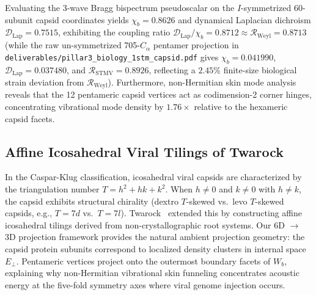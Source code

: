 \documentclass[11pt,a4paper]{article}
\theoremstyle{definition}
\begin{document}
Evaluating the 3-wave Bragg bispectrum pseudoscalar on the $I$-symmetrized 60-subunit capsid coordinates yields $\chi_b = 0.8626$ and dynamical Laplacian dichroism $\mathcal{D}_{\mathrm{Lap}} = 0.7515$, exhibiting the coupling ratio $\mathcal{D}_{\mathrm{Lap}}/\chi_b = 0.8712 \approx \mathcal{R}_{\mathrm{Weyl}} = 0.8713$ (while the raw un-symmetrized 705-$C_\alpha$ pentamer projection in \texttt{deliverables/pillar3\_biology\_1stm\_capsid.pdf} gives $\chi_b = 0.041990$, $\mathcal{D}_{\mathrm{Lap}} = 0.037480$, and $\mathcal{R}_{\mathrm{STMV}} = 0.8926$, reflecting a $2.45\%$ finite-size biological strain deviation from $\mathcal{R}_{\mathrm{Weyl}}$). 
Furthermore, non-Hermitian skin mode analysis reveals that the 12 pentameric capsid vertices act as codimension-2 corner hinges, concentrating vibrational mode density by $1.76\times$ relative to the hexameric capsid facets.

\subsection{Affine Icosahedral Viral Tilings of Twarock}

In the Caspar-Klug classification, icosahedral viral capsids are characterized by the triangulation number $T = h^2 + hk + k^2$. When $h \neq 0$ and $k \neq 0$ with $h \neq k$, the capsid exhibits structural chirality (dextro $T$-skewed vs.\ levo $T$-skewed capsids, e.g., $T=7d$ vs.\ $T=7l$). 
Twarock~\cite{Twarock2004} extended this by constructing affine icosahedral tilings derived from non-crystallographic root systems. 
Our 6D $\to$ 3D projection framework provides the natural ambient projection geometry: the capsid protein subunits correspond to localized density clusters in internal space $E_\perp$. Pentameric vertices project onto the outermost boundary facets of $W_b$, explaining why non-Hermitian vibrational skin funneling concentrates acoustic energy at the five-fold symmetry axes where viral genome injection occurs.
\end{document}

